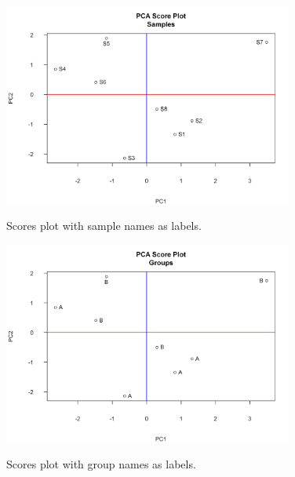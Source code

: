 \documentclass[english,a4paper,12pt]{article}
\begin{document}
\begin{figure}[p]
\centering
\includegraphics[width=0.85\textwidth]{images/PCA_scores_smpl.png} \\
\caption[PCA - Scores (by sample)]{Scores plot with sample names as labels.}
\label{fig:PCA_scores_smpl}
\end{figure}

\begin{figure}[p]
\centering
\includegraphics[width=0.85\textwidth]{images/PCA_scores_grp.png} \\
\caption[PCA - Scores (by group)]{Scores plot with group names as labels.}
\label{fig:PCA_scores_grp}
\end{figure}
\end{document}
